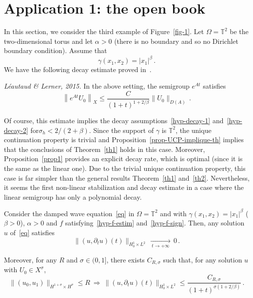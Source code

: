 \documentclass[AHL,Unicode,longabstracts]{cedram}
\newcommand{\TT}{\mathbb{T}}
\begin{document}
\section{Application 1: the open book}\label{section-appli1}

In this section, we consider the third example of Figure~\ref{fig-1}. Let $\Omega=\TT^2$ be the two-dimensional torus and let $\alpha>0$ (there is no boundary and so no Dirichlet boundary condition). Assume that
\[
\gamma(x_1,x_2)=|x_1|^\beta\,.
\]
We have the following decay estimate proved in~\cite[Theorem~1.7]{Leautaud-Lerner}.

\begin{theo}\label{th-Matthieu-Lerner}
\emph{Léautaud \& Lerner, 2015.}
In the above setting, the semigroup $e^{At}$ satisfies
\[
\left\|e^{At} U_0\right\|_X \leq \frac C{(1+t)^{1+2/\beta}} \|U_0\|_{D(A)}\,.
\]
\end{theo}

Of course, this estimate implies the decay assumptions~\eqref{hyp-decay-1} and~\eqref{hyp-decay-2} for\linebreak$\sigma_h < 2/(2+\beta)$. Since the support of $\gamma$ is $\TT^2$, the unique continuation property is trivial and Proposition~\ref{prop-UCP-implique-th} implies that the conclusions of Theorem~\ref{th1} holds in this case. Moreover, Proposition~\ref{prop1} provides an explicit decay rate, which is optimal (since it is the same as the linear one). Due to the trivial unique continuation property, this case is far simpler than the general results Theorem~\ref{th1} and~\ref{th2}. Nevertheless, it seems the first non-linear stabilization and decay estimate in a case where the linear semigroup has only a polynomial decay.

\begin{theo}\label{th-appli1}
Consider the damped wave equation~\eqref{eq} in $\Omega=\TT^2$ and with $\gamma(x_1,x_2)=|x_1|^\beta$ ($\beta>0$), $\alpha>0$ and $f$ satisfying~\eqref{hyp-f-estim} and~\eqref{hyp-f-sign}. Then, any solution $u$ of~\eqref{eq} satisfies
\[
\|(u,\partial_t u)(t)\|_{H^1_0\times L^2}\,\xrightarrow[\:t\longrightarrow
+\infty\:]{}\,0\,.
\]

Moreover, for any $R$ and $\sigma\in (0,1]$, there exists $C_{R,\sigma}$ such that, for any solution $u$ with $U_0\in X^\sigma$,
\[
\|(u_0,u_1)\|_{H^{1+\sigma}\times H^\sigma}\leq
R\:\Longrightarrow\:\|(u,\partial_t u)(t)\|_{H^1_0\times L^2} \leq
\frac{C_{R,\sigma}}{(1+t)^{\sigma(1+2/\beta)}}\,.
\]
\end{theo}
\end{document}
